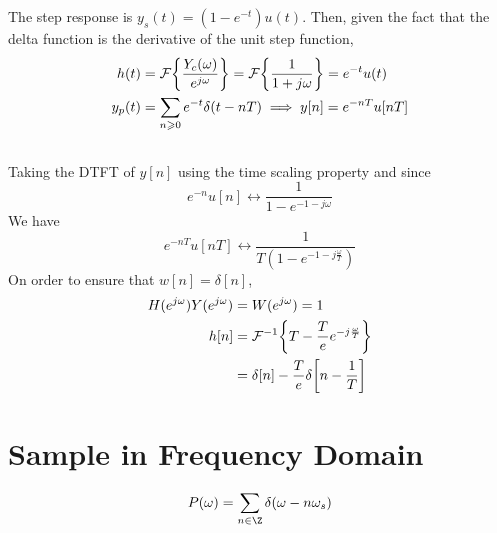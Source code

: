 \documentclass{article}
\begin{document}
\subsection{}

The step response is \(y_s(t) = (1 - e^{-t}) u(t)\).
Then, given the fact that the delta function is the derivative of the unit step function,
\begin{align}
    h(t) &= \mathcal{F}\qty{\frac{Y_c(\omega)}{e^{j \omega}}} = \mathcal{F}\qty{\frac{1}{1 + j \omega}} = e^{-t} u(t) \\
    y_p(t) &= \sum_{n \geqslant 0} e^{-t} \delta(t - nT) \implies y[n] = e^{-nT} u[nT]
\end{align}

\subsection{}

Taking the DTFT of \(y[n]\) using the time scaling property and since
\begin{equation}
    e^{-n} u[n] \longleftrightarrow \frac{1}{1 - e^{-1 - j \omega}}
\end{equation}
We have
\begin{equation}
    e^{-nT} u[nT] \longleftrightarrow \frac{1}{T (1 - e^{-1 - j \frac{\omega}{T}})}
\end{equation}
On order to ensure that \(w[n] = \delta[n]\),
\begin{align}
    H(e^{j \omega}) Y(e^{j \omega}) &= W(e^{j \omega}) = 1 \\
    h[n] &= \mathcal{F}^{-1}\qty{T - \frac{T}{e}e^{-j \frac{\omega}{T}}} \\
    &= \delta[n] - \frac{T}{e} \delta\qty[n - \frac{1}{T}]
\end{align}

\section{Sample in Frequency Domain}

\begin{equation}
    P(\omega) = \sum_{n \in \Z} \delta(\omega - n\omega_s)
\end{equation}

\subsection{}

\begin{center}
\end{center}
\end{document}
